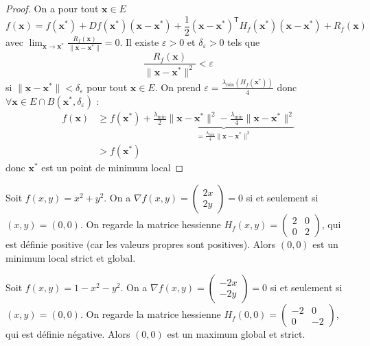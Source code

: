\begin{proof}
On a pour tout $\boldsymbol{x}\in E$ 
$$
f(\boldsymbol{x})=f(\boldsymbol{x}^{*})+Df(\boldsymbol{x}^{*})(\boldsymbol{x}-\boldsymbol{x}^{*})+\frac{1}{2}(\boldsymbol{x}-\boldsymbol{x}^{*})^{\mathsf{T}}H_{f}(\boldsymbol{x}^{*})(\boldsymbol{x}-\boldsymbol{x}^{*})+R_{f}(\boldsymbol{x})
$$
avec $\lim_{ \boldsymbol{x} \to \boldsymbol{x}^{*} } \frac{R_{f}(\boldsymbol{x})}{\lVert \boldsymbol{x}-\boldsymbol{x}^{*} \rVert}=0$. Il existe $\varepsilon>0$ et $\delta _{\varepsilon}>0$ tels que
$$
\frac{R_{f}(\boldsymbol{x})}{\lVert \boldsymbol{x}-\boldsymbol{x}^{*} \rVert^{2} }<\varepsilon
$$
si $\lVert \boldsymbol{x}-\boldsymbol{x}^{*} \rVert<\delta _{\varepsilon}$ pour tout $\boldsymbol{x}\in E$. On prend $\varepsilon= \frac{\lambda _{\mathrm{min}}(H_{f}(\boldsymbol{x}^{*}))}{4}$ donc $\forall \boldsymbol{x}\in E\cap B(\boldsymbol{x}^{*},\delta _{\varepsilon})$ :
\begin{align*}
f(\boldsymbol{x}) & \ge f(\boldsymbol{x}^{*})+ \underbrace{ \frac{\lambda _{\mathrm{min}}}{2}\lVert \boldsymbol{x}-\boldsymbol{x}^{*} \rVert ^{2}-\frac{\lambda _{\mathrm{min}}}{4}\lVert \boldsymbol{x}-\boldsymbol{x}^{*} \rVert^{2} }_{ =\frac{\lambda _{\mathrm{min}}}{4}\lVert \boldsymbol{x}-\boldsymbol{x}^{*} \rVert  ^{2}} \\
	 & > f(\boldsymbol{x}^{*})
\end{align*}
donc $\boldsymbol{x}^{*}$ est un point de minimum local
\end{proof}
\begin{example}
Soit $f(x,y)=x^{2}+y^{2}$. On a $\nabla f(x,y)=\begin{pmatrix}2x \\ 2y\end{pmatrix}=0$ si et seulement si $(x,y)=(0,0)$. On regarde la matrice hessienne $H_{f}(x,y)=\begin{pmatrix}2 & 0 \\ 0 & 2\end{pmatrix}$, qui est définie positive (car les valeurs propres sont positives). Alors $(0,0)$ est un minimum local strict et global.
\end{example}
\begin{example}
Soit $f(x,y)=1-x^{2}-y^{2}$. On a $\nabla f(x,y)=\begin{pmatrix}-2x \\ -2y\end{pmatrix}=0$ si et seulement si $(x,y)=(0,0)$. On regarde la matrice hessienne $H_{f}(0,0)=\begin{pmatrix}-2 & 0 \\ 0 & -2\end{pmatrix}$, qui est définie négative. Alors $(0,0)$ est un maximum global et strict. 
\end{example}
